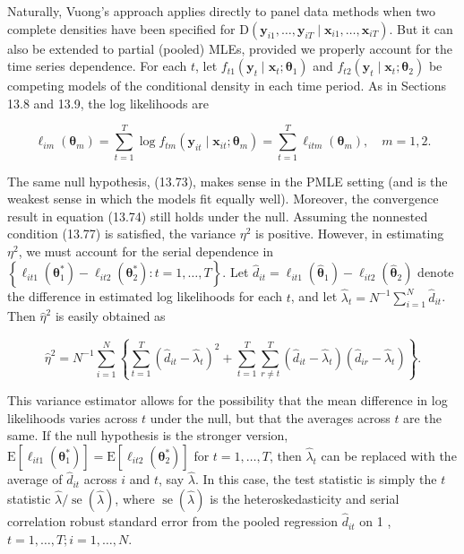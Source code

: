 \documentclass[10pt]{article}
\begin{document}
Naturally, Vuong's approach applies directly to panel data methods when two complete densities have been specified for $\mathrm{D}\left(\mathbf{y}_{i 1}, \ldots, \mathbf{y}_{i T} \mid \mathbf{x}_{i 1}, \ldots, \mathbf{x}_{i T}\right)$. But it can also be extended to partial (pooled) MLEs, provided we properly account for the time series dependence. For each $t$, let $f_{t 1}\left(\mathbf{y}_{t} \mid \mathbf{x}_{t} ; \boldsymbol{\theta}_{1}\right)$ and $f_{t 2}\left(\mathbf{y}_{t} \mid \mathbf{x}_{t} ; \boldsymbol{\theta}_{2}\right)$ be competing models of the conditional density in each time period. As in Sections 13.8 and 13.9, the log likelihoods are


\begin{equation*}
\ell_{i m}\left(\boldsymbol{\theta}_{m}\right)=\sum_{t=1}^{T} \log f_{t m}\left(\mathbf{y}_{i t} \mid \mathbf{x}_{i t} ; \boldsymbol{\theta}_{m}\right)=\sum_{t=1}^{T} \ell_{i t m}\left(\boldsymbol{\theta}_{m}\right), \quad m=1,2 . \tag{13.78}
\end{equation*}


The same null hypothesis, (13.73), makes sense in the PMLE setting (and is the weakest sense in which the models fit equally well). Moreover, the convergence result in equation (13.74) still holds under the null. Assuming the nonnested condition (13.77) is satisfied, the variance $\eta^{2}$ is positive. However, in estimating $\eta^{2}$, we must account for the serial dependence in $\left\{\ell_{i t 1}\left(\boldsymbol{\theta}_{1}^{*}\right)-\ell_{i t 2}\left(\boldsymbol{\theta}_{2}^{*}\right): t=1, \ldots, T\right\}$. Let $\hat{d}_{i t}= \ell_{i t 1}\left(\hat{\boldsymbol{\theta}}_{1}\right)-\ell_{i t 2}\left(\hat{\boldsymbol{\theta}}_{2}\right)$ denote the difference in estimated log likelihoods for each $t$, and let $\hat{\lambda}_{t}=N^{-1} \sum_{i=1}^{N} \hat{d}_{i t}$. Then $\hat{\eta}^{2}$ is easily obtained as


\begin{equation*}
\hat{\eta}^{2}=N^{-1} \sum_{i=1}^{N}\left\{\sum_{t=1}^{T}\left(\hat{d}_{i t}-\hat{\lambda}_{t}\right)^{2}+\sum_{t=1}^{T} \sum_{r \neq t}^{T}\left(\hat{d}_{i t}-\hat{\lambda}_{t}\right)\left(\hat{d}_{i r}-\hat{\lambda}_{t}\right)\right\} . \tag{13.79}
\end{equation*}


This variance estimator allows for the possibility that the mean difference in log likelihoods varies across $t$ under the null, but that the averages across $t$ are the same. If the null hypothesis is the stronger version, $\mathrm{E}\left[\ell_{i t 1}\left(\boldsymbol{\theta}_{1}^{*}\right)\right]=\mathrm{E}\left[\ell_{i t 2}\left(\boldsymbol{\theta}_{2}^{*}\right)\right]$ for $t=1, \ldots, T$, then $\hat{\lambda}_{t}$ can be replaced with the average of $\hat{d}_{i t}$ across $i$ and $t$, say $\hat{\lambda}$. In this case, the test statistic is simply the $t$ statistic $\hat{\lambda} / \operatorname{se}(\hat{\lambda})$, where $\operatorname{se}(\hat{\lambda})$ is the heteroskedasticity and serial correlation robust standard error from the pooled regression $\hat{d}_{i t}$ on 1 , $t=1, \ldots, T ; i=1, \ldots, N$.
\end{document}
